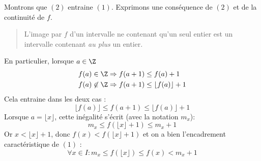\begin{enumerate}
Montrons que $(2)$ entraine $(1)$. Exprimons une conséquence de $(2)$ et de la continuité de $f$.
\begin{quote}
 L'image par $f$ d'un intervalle ne contenant qu'un seul entier est un intervalle contenant \emph{au plus} un entier.
\end{quote} 
En particulier, lorsque $a\in \Z$
\begin{align*}
 f(a)\in \Z &\Rightarrow f(a+1)\leq f(a)+1 \\
 f(a)\not \in \Z &\Rightarrow f(a+1) \leq \lfloor f(a)\rfloor +1
\end{align*}
Cela entraine dans les deux cas :
\begin{displaymath}
 \lfloor f(a)\rfloor \leq f(a+1) \leq \lfloor f(a)\rfloor +1
\end{displaymath}
Lorsque $a=\lfloor x \rfloor$, cette inégalité s'écrit (avec la notation $m_x$):
\begin{displaymath}
 m_x \leq f(\lfloor x \rfloor +1) \leq m_x +1
\end{displaymath}
Or $x < \lfloor x \rfloor +1$, donc $f(x)<f(\lfloor x \rfloor +1)$ et on a bien l'encadrement caractéristique de $(1)$ :
\begin{displaymath}
 \forall x\in I : m_x\leq f(\lfloor x \rfloor) \leq f(x) < m_x +1
\end{displaymath}
\end{enumerate}

